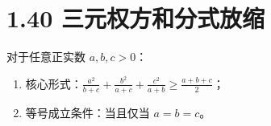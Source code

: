 \documentclass{article}
\begin{document}
\section*{1.40 三元权方和分式放缩}
对于任意正实数 \( a,b,c>0 \)：
\begin{enumerate}
    \item 核心形式：\( \frac{a^2}{b+c}+\frac{b^2}{a+c}+\frac{c^2}{a+b} \geq \frac{a+b+c}{2} \)；
    \item 等号成立条件：当且仅当 \( a=b=c \)。
\end{enumerate}
\end{document}
